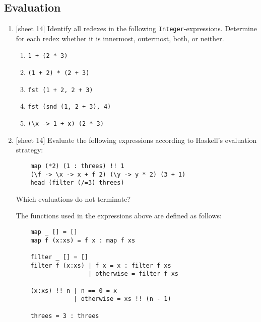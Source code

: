 \documentclass{article}
\def\code#1{\texttt{#1}}
\begin{document}
\subsection{Evaluation}
\begin{enumerate}
    \item {[sheet 14]} Identify all redexes in the following \code{Integer}-expressions. Determine for each redex whether it is innermost, outermost, both, or neither.
        \begin{enumerate}
            \item \code{1 + (2 * 3)}
            \item \code{(1 + 2) * (2 + 3)}
            \item \code{fst (1 + 2, 2 + 3)}
            \item \code{fst (snd (1, 2 + 3), 4)}
            \item \code{(\textbackslash x -> 1 + x) (2 * 3)}
        \end{enumerate}

    \item {[sheet 14]} Evaluate the following expressions according to Haskell's evaluation strategy:
        \begin{verbatim}
    map (*2) (1 : threes) !! 1
    (\f -> \x -> x + f 2) (\y -> y * 2) (3 + 1)
    head (filter (/=3) threes)
        \end{verbatim}
        Which evaluations do not terminate? \par
        The functions used in the expressions above are defined as follows:
        \begin{verbatim}
    map _ [] = []
    map f (x:xs) = f x : map f xs

    filter _ [] = []
    filter f (x:xs) | f x = x : filter f xs
                    | otherwise = filter f xs

    (x:xs) !! n | n == 0 = x
                | otherwise = xs !! (n - 1)

    threes = 3 : threes
        \end{verbatim}
\end{enumerate}
\end{document}
